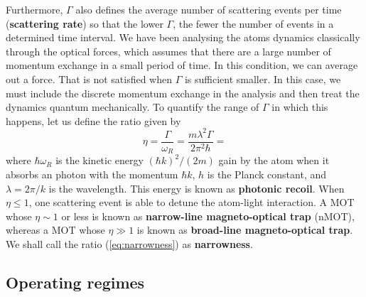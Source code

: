 Furthermore, $ \Gamma $ also defines the average number of scattering events per time (\textbf{scattering rate}) so that the lower $ \Gamma $, the fewer the number of events in a determined time interval. We have been analysing the atoms dynamics classically through the optical forces, which assumes that there are a large number of momentum exchange in a small period of time. In this condition, we can average out a force. That is not satisfied when $ \Gamma $ is sufficient smaller. In this case, we must include the discrete momentum exchange in the analysis and then treat the dynamics quantum mechanically. To quantify the range of $ \Gamma $ in which this happens, let us define the ratio given by
\begin{equation}
    \eta = \frac{\Gamma}{\omega_R} = \frac{m \lambda^2 \Gamma}{2\pi^2 \hbar} =
    \label{eq:narrowness}
\end{equation}
where $ \hbar \omega_R $ is the kinetic energy $ (\hbar k)^2 / (2 m) $ gain by the atom when it absorbs an photon with the momentum $ \hbar k $, $ h $ is the Planck constant, and $ \lambda = 2\pi/k $ is the wavelength. This energy is known as \textbf{photonic recoil}. When $ \eta \leq 1 $, one scattering event is able to detune the atom-light interaction. A MOT whose $ \eta \sim 1 $ or less is known as \textbf{narrow-line magneto-optical trap} (nMOT), whereas a MOT whose $ \eta \gg 1 $ is known as \textbf{broad-line magneto-optical trap}. We shall call the ratio (\ref{eq:narrowness}) as \textbf{narrowness}.


\subsection{Operating regimes}
\label{sec:nMOT-operating-regimes}

